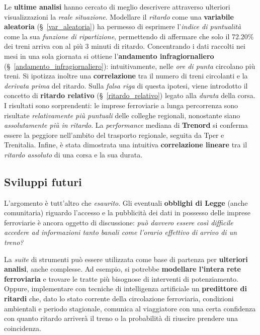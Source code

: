 \documentclass[12pt,italian]{report}
\begin{document}
Le \textbf{ultime analisi} hanno cercato di meglio descrivere
attraverso ulteriori visualizzazioni la \textit{reale situazione}.
Modellare il \textit{ritardo} come una \textbf{variabile aleatoria}
(\S~\ref{var_aleatoria}) ha permesso di esprimere l'\textit{indice di
    puntualità} come la sua \textit{funzione di ripartizione},
permettendo di affermare che solo il 72.20\% dei treni arriva con al
più 3 minuti di ritardo.
Concentrando i dati raccolti nei mesi in una
sola giornata si ottiene l'\textbf{andamento infragiornaliero}
(\S~\ref{andamento_infragiornaliero}): intuitivamente, nelle
\textit{ore di punta} circolano più treni.  Si ipotizza inoltre una
\textbf{correlazione} tra il numero di treni circolanti e la
\textit{derivata prima} del ritardo.  Sulla \textit{falsa riga} di
questa ipotesi, viene introdotto il concetto di \textbf{ritardo
    relativo} (\S~\ref{ritardo_relativo}) legato alla \textit{durata}
della corsa.  I risultati sono sorprendenti: le imprese ferroviarie a
lunga percorrenza sono risultate \textit{relativamente più puntuali}
delle colleghe regionali, nonostante siano \textit{assolutamente più
    in ritardo}.  La \textit{performance} mediana di \textbf{Trenord}
si conferma essere la peggiore nell'ambito del trasporto regionale,
seguita da Tper e Trenitalia.  Infine, è stata dimostrata una
intuitiva \textbf{correlazione lineare} tra il \textit{ritardo
    assoluto} di una corsa e la sua durata.

\subsection{Sviluppi futuri}

L'argomento è tutt'altro che \textit{esaurito}.  Gli eventuali
\textbf{obblighi di Legge} (anche comunitaria) riguardo l'accesso e la
pubblicità dei dati in possesso delle imprese ferroviarie è ancora
oggetto di discussione: \textit{può davvero essere così difficile
    accedere ad informazioni tanto banali come l'orario effettivo di
    arrivo di un treno?}

La \textit{suite} di strumenti può essere utilizzata come base di
partenza per \textbf{ulteriori analisi}, anche complesse.  Ad esempio,
si potrebbe \textbf{modellare l'intera rete ferroviaria} e trovare le
tratte più bisognose di interventi di potenziamento.  Oppure,
implementare con tecniche di intelligenza artificiale un
\textbf{predittore di ritardi} che, dato lo stato corrente della
circolazione ferroviaria, condizioni ambientali e periodo stagionale,
comunica al viaggiatore con una certa confidenza con quanto ritardo
arriverà il treno o la probabilità di riuscire prendere una
coincidenza.
\end{document}
